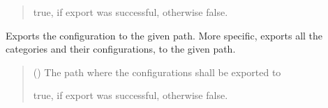 \documentclass[letterpaper,10pt,english]{sphinxmanual}
\begin{document}
\begin{fulllineitems}
\begin{fulllineitems}
\begin{quote}
\begin{description}
\sphinxAtStartPar
true, if export was successful, otherwise false.

\sphinxAtStartPar
{}

\end{description}\end{quote}

\end{fulllineitems}


\begin{fulllineitems}
\label{\detokenize{apidoc/src.osm_configurator.model.project:src.osm_configurator.model.project.export.Export.export_configuration}}
\pysigstartsignatures
{}
\pysigstopsignatures
\sphinxAtStartPar
Exports the configuration to the given path. More specific, exports all the categories and their configurations,
to the given path.
\begin{quote}\begin{description}
\sphinxAtStartPar
{} () \textendash{} The path where the configurations shall be exported to

\sphinxAtStartPar
true, if export was successful, otherwise false.

\sphinxAtStartPar
{}

\end{description}\end{quote}

\end{fulllineitems}



\end{fulllineitems}
\end{document}
